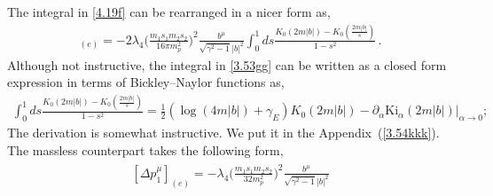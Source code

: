 The integral in \eqref{4.19f} can be rearranged in a nicer form as,
\begin{align}
    [\Delta p_1^{\mu}]_{(e)}=-2 \lambda_4\Big(\frac{m_1s_1m_2s_2}{16\pi m_p^2}\Big)^2\frac{b^\mu}{\sqrt{\gamma^2-1}|b|^2}\int_0^1 ds\frac{K_0(2m|b|)-K_0\left(\frac{2m|b|}{s}\right)}{1-s^2}\,.\label{3.53gg}
\end{align}
Although not instructive, the integral in \eqref{3.53gg} can be written as a closed form expression in terms of Bickley–Naylor functions as,
\begin{align}
  \int_0^1 ds\frac{K_0(2m|b|)-K_0\left(\frac{2m|b|}{s}\right)}{1-s^2}  =\frac{1}{2} (\log (4m |b|)+\gamma_{E} ) K_0(2 m|b|)-\partial_\alpha \textrm{Ki}_{\alpha}(2m|b|)|_{\alpha\to0};\label{3.54kk}
\end{align}
The derivation is somewhat instructive. We put it in the Appendix~(\ref{3.54kkk}).
The massless counterpart takes the following form,
\begin{align}
    \begin{split}
        [\Delta p_1^{\mu}]_{(e)}=- \lambda_4\Big(\frac{m_1s_1m_2s_2}{32m_p^2}\Big)^2\frac{b^\mu}{\sqrt{\gamma^2-1}|b|^2}
    \end{split}
\end{align}


